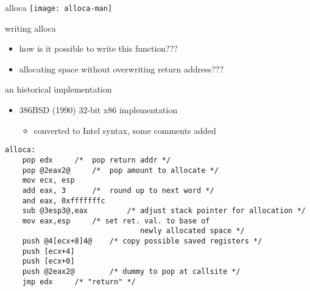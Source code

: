 \begin{frame}{alloca}
\texttt{[image: alloca-man]}
\end{frame}

\begin{frame}{writing alloca}
\begin{itemize}
\item how is it possible to write this function???
\item allocating space without overwriting return address???
\end{itemize}
\end{frame}

\begin{frame}[fragile,label=histBSDAlloca]{an historical implementation}
\begin{itemize}
\item 386BSD (1990) 32-bit x86 implementation
\begin{itemize}\item converted to Intel syntax, some comments added\end{itemize}
\end{itemize}
\begin{lstlisting}
alloca:
    pop edx		/*  pop return addr */
    pop @2eax2@		/*  pop amount to allocate */
    mov	ecx, esp
    add	eax, 3		/*  round up to next word */
    and eax, 0xfffffffc
    sub @3esp3@,eax         /* adjust stack pointer for allocation */
    mov	eax,esp 	/* set ret. val. to base of
                               newly allocated space */
    push @4[ecx+8]4@	/* copy possible saved registers */
    push [ecx+4]
    push [ecx+0]
    push @2eax2@		/* dummy to pop at callsite */
    jmp	edx		/* "return" */
\end{lstlisting}
\end{frame}
